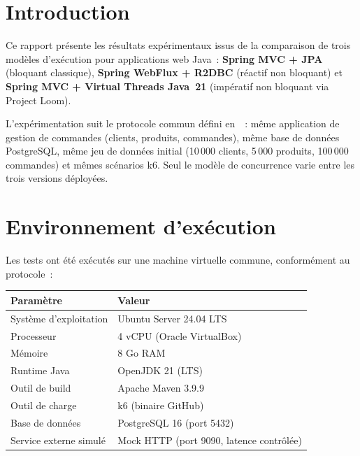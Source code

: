 \section{Introduction}

Ce rapport présente les résultats expérimentaux issus de la comparaison de trois modèles
d'exécution pour applications web Java~: \textbf{Spring MVC + JPA} (bloquant classique),
\textbf{Spring WebFlux + R2DBC} (réactif non bloquant) et \textbf{Spring MVC + Virtual Threads
Java~21} (impératif non bloquant via Project Loom).

L'expérimentation suit le protocole commun défini en~\cite{protocole}~: même application de
gestion de commandes (clients, produits, commandes), même base de données PostgreSQL, même jeu de
données initial (10\,000 clients, 5\,000 produits, 100\,000 commandes) et mêmes scénarios k6.
Seul le modèle de concurrence varie entre les trois versions déployées.

\section{Environnement d'exécution}

Les tests ont été exécutés sur une machine virtuelle commune, conformément au protocole~:

\begin{center}
\begin{tabular}{|l|l|}
\hline
\textbf{Paramètre}         & \textbf{Valeur} \\
\hline
Système d'exploitation     & Ubuntu Server 24.04 LTS \\
Processeur                 & 4 vCPU (Oracle VirtualBox) \\
Mémoire                    & 8 Go RAM \\
Runtime Java               & OpenJDK 21 (LTS) \\
Outil de build             & Apache Maven 3.9.9 \\
Outil de charge            & k6 (binaire GitHub) \\
Base de données            & PostgreSQL 16 (port 5432) \\
Service externe simulé     & Mock HTTP (port 9090, latence contrôlée) \\
\hline
\end{tabular}
\end{center}

